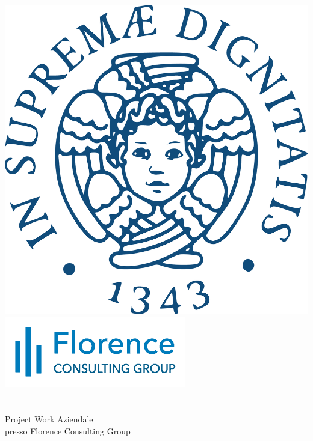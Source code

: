 \begin{titlepage}
	\begin{center}
   	\large
      \hfill
      \vfill
      \begingroup
        \includegraphics[scale=0.055]{logo/unipi} \quad
        \includegraphics[scale=0.7]{logo/florence}
        \newline
        \newline
 		\spacedallcaps{\myUni} \\ 
		\myFaculty \\
		\vspace{0.5cm}
		\myDegree \\ 
		\vspace{0.5cm}
        \vspace{0.5cm}    
        Project Work Aziendale \\
        presso Florence Consulting Group
      \endgroup 
      \vfill 
      \begingroup
      	\color{Maroon}\spacedallcaps{\myItalianTitle} \\ $\ $\\
	\bigskip
      \endgroup
      \spacedlowsmallcaps{\myName}
      \vfill 
      \vfill
      \emph{\myProf}\\
      \vfill
      \vfill
      \myTime
      \vfill                      
	\end{center}        
\end{titlepage}   
